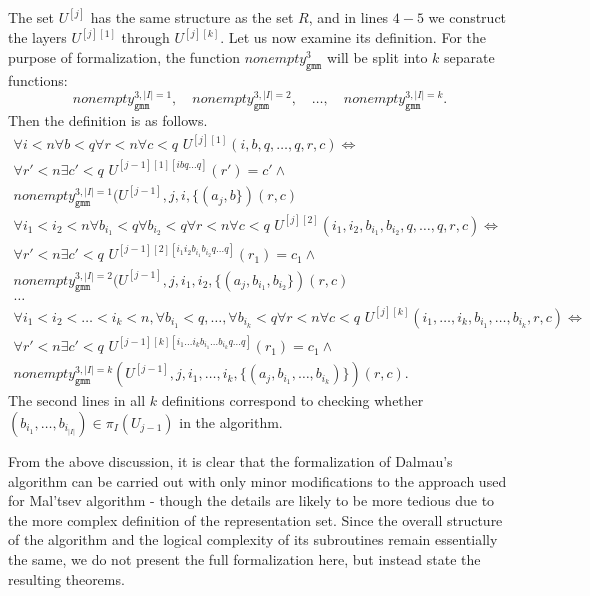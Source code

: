 \documentclass{article}
\theoremstyle{definition}
\theoremstyle{theorem}
\theoremstyle{theorem}
\theoremstyle{remark}
\theoremstyle{remark}
\theoremstyle{example}
\theoremstyle{notation}
\theoremstyle{theorem}
\begin{document}
The set $U^{[j]}$ has the same structure as the set $R$, and in lines $4-5$ we construct the layers $U^{[j][1]}$ through $U^{[j][k]}$. Let us now examine its definition. For the purpose of formalization, the function $nonempty_{\texttt{gmm}}^3$ will be split into $k$ separate functions:
\[
nonempty_{\texttt{gmm}}^{3,|I|=1}, \quad nonempty_{\texttt{gmm}}^{3,|I|=2}, \quad \ldots, \quad nonempty_{\texttt{gmm}}^{3,|I|=k}.
\]
Then the definition is as follows. 
\begin{equation}
    \begin{gathered}
  \forall i<n\forall b<q \forall r<n\forall c<q \,\,U^{[j][1]}(i,b,q,\ldots,q,r, c) \iff \\
  \forall r'<n \exists c'<q\,\,
  U^{[j-1][1][ibq\ldots q]}(r')=c'\wedge 
  \\
nonempty_{\texttt{gmm}}^{3,|I|=1}(U^{[j-1]}, j,i,\{(a_{j},b\})(r,c)
  \\
  \forall i_1<i_2<n\forall b_{i_1}<q \forall b_{i_2}<q \forall r<n\forall c<q \,\,U^{[j][2]}(i_1,i_2,b_{i_1},b_{i_2},q,\ldots,q,r, c) \iff \\
  \forall r'<n \exists c'<q\,\,
  U^{[j-1][2][i_1i_2b_{i_1}b_{i_2}q\ldots q]}(r_1)=c_1\wedge 
  \\
nonempty_{\texttt{gmm}}^{3,|I|=2}(U^{[j-1]}, j,i_1,i_2,\{(a_{j},b_{i_1},b_{i_2}\})(r,c)\\
  \ldots \\
\forall i_1<i_2<\ldots <i_k<n, \forall b_{i_1}<q,\ldots,\forall b_{i_k}<q\forall r<n\forall c<q \,\,U^{[j][k]}(i_1,\ldots,i_k,b_{i_1},\ldots,b_{i_k},r, c) \iff \\
  \forall r'<n \exists c'<q\,\,
  U^{[j-1][k][i_1\ldots i_kb_{i_1}\ldots b_{i_k}q\ldots q]}(r_1)=c_1\wedge 
  \\
nonempty_{\texttt{gmm}}^{3,|I|=k}(U^{[j-1]}, j,i_1,\ldots,i_k,\{(a_{j},b_{i_1},\ldots,b_{i_k})\})(r,c).
    \end{gathered}
\end{equation}
The second lines in all $k$ definitions correspond to checking whether $(b_{i_1}, \ldots, b_{i_{|I|}}) \in \pi_I(U_{j-1})$ in the algorithm.

From the above discussion, it is clear that the formalization of Dalmau's algorithm can be carried out with only minor modifications to the approach used for Mal'tsev algorithm - though the details are likely to be more tedious due to the more complex definition of the representation set. Since the overall structure of the algorithm and the logical complexity of its subroutines remain essentially the same, we do not present the full formalization here, but instead state the resulting theorems.
\end{document}
